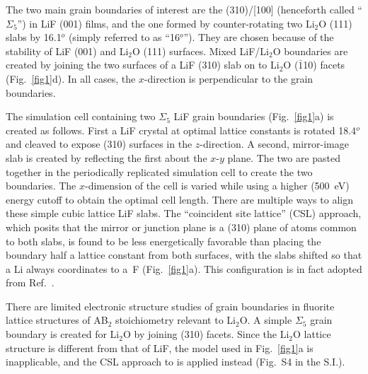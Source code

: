 \documentclass[prb,preprint,amsmath,amssymb]{revtex4}
\begin{document}
The two main grain boundaries of interest are the (310)/[100] (henceforth
called ``$\Sigma_5$'') in LiF (001) films, and the one formed by
counter-rotating two Li$_2$O (111) slabs by 16.1$^o$ (simply referred to as
``16$^o$'').  They are chosen because of the stability of LiF (001) and Li$_2$O
(111) surfaces.  Mixed LiF/Li$_2$O boundaries are created by joining the two
surfaces of a LiF (310) slab on to Li$_2$O ($\bar{1}$10) facets
(Fig.~\ref{fig1}d).  In all cases, the $x$-direction is perpendicular to
the grain boundaries.  

The simulation cell containing two $\Sigma_5$ LiF grain boundaries
(Fig.~\ref{fig1}a) is created as follows.  First a LiF crystal at optimal
lattice constants is rotated 18.4$^o$ and cleaved to expose (310) surfaces in
the $z$-direction.  A second, mirror-image  slab is created by reflecting the
first about the $x$-$y$ plane.  The two are pasted together in the periodically
replicated simulation cell to create the two boundaries.   The $x$-dimension
of the cell is varied while using a higher (500~eV) energy cutoff to obtain
the optimal cell length.  There are multiple ways to align these simple cubic
lattice LiF slabs.  The ``coincident site lattice'' (CSL) approach,\cite{fisher}
which posits that the mirror or junction plane is a (310) plane of atoms
common to both slabs, is found to be less energetically favorable than placing
the boundary half a lattice constant from both surfaces, with the slabs shifted
so that a Li always coordinates to a~F (Fig.~\ref{fig1}a).  This configuration
is in fact adopted from Ref.~. 

There are limited electronic structure studies of grain
boundaries in fluorite lattice structures of AB$_2$ stoichiometry relevant
to Li$_2$O.\cite{fisher,islam,shluger,brutzel} A simple $\Sigma_5$ grain
boundary is created for Li$_2$O by joining (310) facets.  Since the Li$_2$O
lattice structure is different from that of LiF, the model used in
Fig.~\ref{fig1}a is inapplicable, and the CSL approach to is
applied instead (Fig.~S4 in the S.I.).
\end{document}
